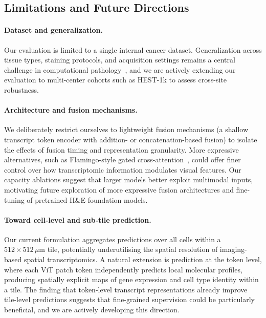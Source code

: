\subsection*{Limitations and Future Directions}
\label{sec:limitations-and-future-directions}

\paragraph{Dataset and generalization.}
Our evaluation is limited to a single internal cancer dataset. Generalization across tissue types, staining protocols, and acquisition settings remains a central challenge in computational pathology~\cite{jaume_hest1kdatasetspatial_2024,chen_visualomicsfoundation_2025}, and we are actively extending our evaluation to multi-center cohorts such as HEST-1k to assess cross-site robustness.

\paragraph{Architecture and fusion mechanisms.}
We deliberately restrict ourselves to lightweight fusion mechanisms (a shallow transcript token encoder with addition- or concatenation-based fusion) to isolate the effects of fusion timing and representation granularity. More expressive alternatives, such as Flamingo-style gated cross-attention~\cite{alayrac_flamingovisuallanguage_2022}, could offer finer control over how transcriptomic information modulates visual features. Our capacity ablations suggest that larger models better exploit multimodal inputs, motivating future exploration of more expressive fusion architectures and fine-tuning of pretrained H\&E foundation models.

\paragraph{Toward cell-level and sub-tile prediction.}
Our current formulation aggregates predictions over all cells within a $512 \times 512\,\mu\text{m}$ tile, potentially underutilising the spatial resolution of imaging-based spatial transcriptomics. A natural extension is prediction at the token level, where each ViT patch token independently predicts local molecular profiles, producing spatially explicit maps of gene expression and cell type identity within a tile. The finding that token-level transcript representations already improve tile-level predictions suggests that fine-grained supervision could be particularly beneficial, and we are actively developing this direction.

